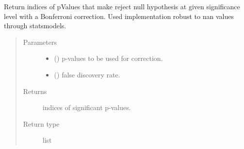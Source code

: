 \documentclass[letterpaper,10pt,english]{sphinxmanual}
\begin{document}
\begin{fulllineitems}
\label{\detokenize{_modules/cosifer.utils:cosifer.utils.stats.bonferroni_correction}}
Return indices of pValues that make reject null hypothesis
at given significance level with a Bonferroni correction.
Used implementation robust to nan values through statsmodels.
\begin{quote}\begin{description}
\item[{Parameters}] \leavevmode\begin{itemize}
\item {} 
 () \textendash{} p-values to be used for correction.

\item {} 
 () \textendash{} false discovery rate.

\end{itemize}

\item[{Returns}] \leavevmode
indices of significant p-values.

\item[{Return type}] \leavevmode
list

\end{description}\end{quote}

\end{fulllineitems}

\end{document}
